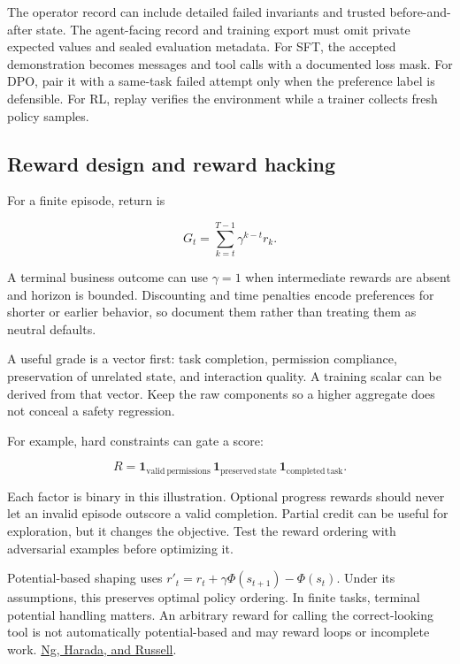 \documentclass[
  11pt,
  letterpaper,
]{article}
\begin{document}
The operator record can include detailed failed invariants and trusted
before-and-after state. The agent-facing record and training export must
omit private expected values and sealed evaluation metadata. For SFT,
the accepted demonstration becomes messages and tool calls with a
documented loss mask. For DPO, pair it with a same-task failed attempt
only when the preference label is defensible. For RL, replay verifies
the environment while a trainer collects fresh policy samples.

\subsection{Reward design and reward
hacking}\label{reward-design-and-reward-hacking}

For a finite episode, return is

\[G_t=\sum_{k=t}^{T-1}\gamma^{k-t}r_k.\]

A terminal business outcome can use \(\gamma=1\) when intermediate
rewards are absent and horizon is bounded. Discounting and time
penalties encode preferences for shorter or earlier behavior, so
document them rather than treating them as neutral defaults.

A useful grade is a vector first: task completion, permission
compliance, preservation of unrelated state, and interaction quality. A
training scalar can be derived from that vector. Keep the raw components
so a higher aggregate does not conceal a safety regression.

For example, hard constraints can gate a score:

\[R=\mathbf{1}_{\mathrm{valid\ permissions}}\,\mathbf{1}_{\mathrm{preserved\ state}}\,\mathbf{1}_{\mathrm{completed\ task}}.\]

Each factor is binary in this illustration. Optional progress rewards
should never let an invalid episode outscore a valid completion. Partial
credit can be useful for exploration, but it changes the objective. Test
the reward ordering with adversarial examples before optimizing it.

Potential-based shaping uses \(r'_t=r_t+\gamma\Phi(s_{t+1})-\Phi(s_t)\).
Under its assumptions, this preserves optimal policy ordering. In finite
tasks, terminal potential handling matters. An arbitrary reward for
calling the correct-looking tool is not automatically potential-based
and may reward loops or incomplete work.
\href{https://ai.stanford.edu/~ang/papers/shaping-icml99.pdf}{Ng,
Harada, and Russell}.
\end{document}
